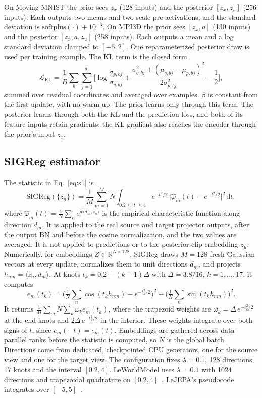 On Moving-MNIST the prior sees $z_x$ (128 inputs) and the posterior $[z_x,z_u]$ (256 inputs). Each outputs two means and two scale pre-activations, and the standard deviation is $\mathrm{softplus}(\cdot)+10^{-6}$. On MPI3D the prior sees $[z_x,a]$ (130 inputs) and the posterior $[z_x,a,z_u]$ (258 inputs). Each outputs a mean and a log standard deviation clamped to $[-5,2]$. One reparameterized posterior draw is used per training example. The KL term is the closed form
\begin{equation}
\label{eq:kl}
\mathcal{L}_{\mathrm{KL}}=\frac1B\sum_{b}\sum_{j=1}^{d_r}\Big[\log\frac{\sigma_{p,bj}}{\sigma_{q,bj}}+\frac{\sigma_{q,bj}^2+(\mu_{q,bj}-\mu_{p,bj})^2}{2\sigma_{p,bj}^2}-\frac12\Big],
\end{equation}
summed over residual coordinates and averaged over examples. $\beta$ is constant from the first update, with no warm-up. The prior learns only through this term. The posterior learns through both the KL and the prediction loss, and both of its feature inputs retain gradients; the KL gradient also reaches the encoder through the prior's input $z_x$.

\subsection{SIGReg estimator}
\label{app:sigreg}

The statistic in Eq.~\eqref{eq:s1} is
\begin{equation}
\label{eq:sigreg}
\mathrm{SIGReg}(\{z_n\})=\frac1M\sum_{m=1}^{M} N\int_{0.2\le|t|\le4} e^{-t^2/2}\,\big|\hat\varphi_m(t)-e^{-t^2/2}\big|^2\,\mathrm{d}t,
\end{equation}
where $\hat\varphi_m(t)=\frac1N\sum_n e^{\mathrm{i}t\langle d_m,z_n\rangle}$ is the empirical characteristic function along direction $d_m$.
It is applied to the real source and target projector outputs, after the output BN and before the cosine normalization, and the two values are averaged. It is not applied to predictions or to the posterior-clip embedding $z_u$. Numerically, for embeddings $Z\in\mathbb R^{N\times128}$, SIGReg draws $M=128$ fresh Gaussian vectors at every update, normalizes them to unit directions $d_m$, and projects $h_{nm}=\langle z_n,d_m\rangle$. At knots $t_k=0.2+(k-1)\Delta$ with $\Delta=3.8/16$, $k=1,\dots,17$, it computes
\[
e_m(t_k)=\Big(\tfrac1N\textstyle\sum_n\cos(t_kh_{nm})-e^{-t_k^2/2}\Big)^2+\Big(\tfrac1N\textstyle\sum_n\sin(t_kh_{nm})\Big)^2 .
\]
It returns $\frac1M\sum_m N\sum_k \omega_k e_m(t_k)$, where the trapezoid weights are $\omega_k=\Delta\,e^{-t_k^2/2}$ at the end knots and $2\Delta\,e^{-t_k^2/2}$ in the interior. These weights integrate over both signs of $t$, since $e_m(-t)=e_m(t)$. Embeddings are gathered across data-parallel ranks before the statistic is computed, so $N$ is the global batch. Directions come from dedicated, checkpointed CPU generators, one for the source view and one for the target view. The configuration fixes $\lambda=0.1$, 128 directions, 17 knots and the interval $[0.2,4]$. LeWorldModel uses $\lambda=0.1$ with 1024 directions and trapezoidal quadrature on $[0.2,4]$~\citep{maes2026lewm}. LeJEPA's pseudocode integrates over $[-5,5]$~\citep{balestriero2025lejepa}.

